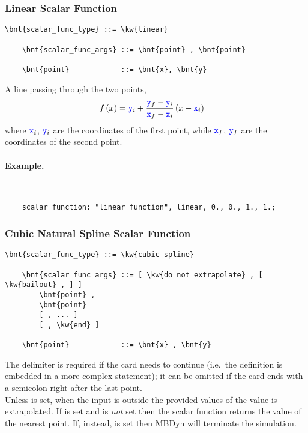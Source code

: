 \subsubsection{Linear Scalar Function}
\begin{Verbatim}[commandchars=\\\{\}]
    \bnt{scalar_func_type} ::= \kw{linear}

    \bnt{scalar_func_args} ::= \bnt{point} , \bnt{point}

    \bnt{point}            ::= \bnt{x}, \bnt{y}
\end{Verbatim}
A line passing through the two points,
\begin{align}
	f\left( x \right)
	&=
	\textcolor{blue}{\texttt{y}}_i
	+
	\frac{\textcolor{blue}{\texttt{y}}_f - \textcolor{blue}{\texttt{y}}_i}{\textcolor{blue}{\texttt{x}}_f - \textcolor{blue}{\texttt{x}}_i} \left( x - \textcolor{blue}{\texttt{x}}_i \right)
\end{align}
where $\textcolor{blue}{\texttt{x}}_i$, $\textcolor{blue}{\texttt{y}}_i$ are the coordinates of the first point,
while $\textcolor{blue}{\texttt{x}}_f$, $\textcolor{blue}{\texttt{y}}_f$ are the coordinates of the second point.

\paragraph{Example.} \
\begin{verbatim}
    scalar function: "linear_function", linear, 0., 0., 1., 1.;
\end{verbatim}

\subsubsection{Cubic Natural Spline Scalar Function}
\begin{Verbatim}[commandchars=\\\{\}]
    \bnt{scalar_func_type} ::= \kw{cubic spline}

    \bnt{scalar_func_args} ::= [ \kw{do not extrapolate} , [ \kw{bailout} , ] ]
        \bnt{point} ,
        \bnt{point}
        [ , ... ]
        [ , \kw{end} ]

    \bnt{point}            ::= \bnt{x} , \bnt{y}
\end{Verbatim}
The  delimiter is required if the card needs to continue
(i.e.\ the \hty{ScalarFunction} definition is embedded in a more complex
statement); it can be omitted if the card ends with a semicolon
right after the last point.\\
Unless  is set, when the input is outside
the provided values of \nt{x} the value is extrapolated. 
If  is set and 
is \emph{not} set then the scalar function returns the value of the nearest point.
If, instead, \kw{bailout} is set then MBDyn will terminate the simulation.



